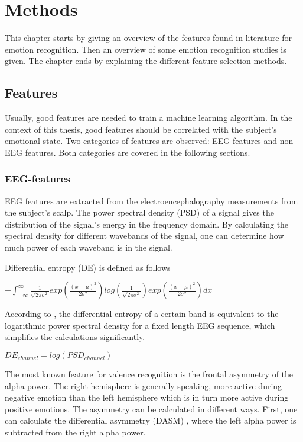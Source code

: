 \chapter{Methods}
{\samenvatting This chapter starts by giving an overview of the features found in literature for emotion recognition. Then an overview of some emotion recognition studies is given. The chapter ends by explaining the different feature selection methods.}

\section{Features}
\label{featuresExplained}
Usually, good features are needed to train a machine learning algorithm. In the context of this thesis, good features should be correlated with the subject's emotional state. Two categories of features are observed: EEG features and non-EEG features. Both categories are covered in the following sections.

\subsection{EEG-features}
EEG features are extracted from the electroencephalography measurements from the subject's scalp. The power spectral density (PSD)  of a signal gives the distribution of the signal's energy in the frequency domain. By calculating the spectral density for different wavebands of the signal, one can determine how much power of each waveband is in the signal.

\npar

Differential entropy (DE) is defined as follows \citep{killyPaper} \\
\begin{center}
$ - \int_{-\infty}^{\infty} \frac{1}{\sqrt{2\pi\sigma^2}} exp(\frac{(x-\mu)^2}{2\sigma^2}) log(\frac{1}{\sqrt{2\pi\sigma^2}}) exp(\frac{(x-\mu)^2}{2\sigma^2})dx$
\end{center}
According to \citep{diffEnt}, the differential entropy of a certain band is equivalent to the logarithmic power spectral density for a fixed length EEG sequence, which simplifies the calculations significantly.
\begin{center}
$DE_{channel} = log(PSD_{channel})$
\end{center}

\npar

The most known feature for valence recognition is the frontal asymmetry of the alpha power\cite{GivenPaper}. The right hemisphere is generally speaking, more active during negative emotion than the left hemisphere which is in turn more active during positive emotions\cite{RealTimeEEGEmotion,EEGDatasets,killyPaper}. The asymmetry can be calculated in different ways. First, one can calculate the differential asymmetry (DASM) , where the left alpha power is subtracted from the right alpha power.

